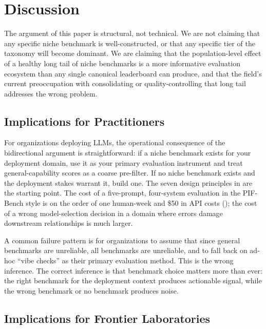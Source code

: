 \documentclass[11pt,a4paper]{article}
\begin{document}
\section{Discussion}
\label{sec:discussion}

The argument of this paper is structural, not technical. We are not claiming that any specific niche benchmark is well-constructed, or that any specific tier of the taxonomy will become dominant. We are claiming that the population-level effect of a healthy long tail of niche benchmarks is a more informative evaluation ecosystem than any single canonical leaderboard can produce, and that the field's current preoccupation with consolidating or quality-controlling that long tail addresses the wrong problem.

\subsection{Implications for Practitioners}
\label{sec:practimpl}

For organizations deploying LLMs, the operational consequence of the bidirectional argument is straightforward: if a niche benchmark exists for your deployment domain, use it as your primary evaluation instrument and treat general-capability scores as a coarse pre-filter. If no niche benchmark exists and the deployment stakes warrant it, build one. The seven design principles in  are the starting point. The cost of a five-prompt, four-system evaluation in the PIF-Bench style is on the order of one human-week and \$50 in API costs (); the cost of a wrong model-selection decision in a domain where errors damage downstream relationships is much larger.

A common failure pattern is for organizations to assume that since general benchmarks are unreliable, all benchmarks are unreliable, and to fall back on ad-hoc ``vibe checks'' as their primary evaluation method. This is the wrong inference. The correct inference is that benchmark choice matters more than ever: the right benchmark for the deployment context produces actionable signal, while the wrong benchmark or no benchmark produces noise.

\subsection{Implications for Frontier Laboratories}
\label{sec:labimpl}
\end{document}
